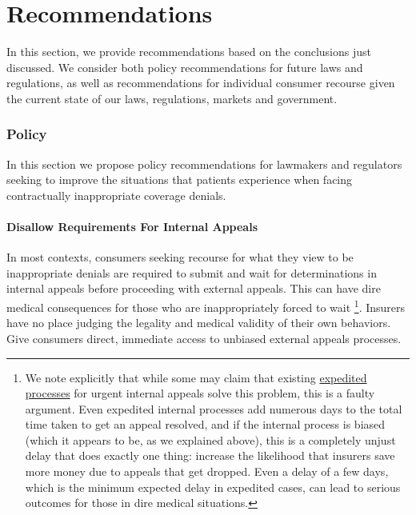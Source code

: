 \documentclass[12pt, a4paper,twoside]{report}
\theoremstyle{plain} %
\theoremstyle{definition} %
\theoremstyle{remark} %
\numberwithin{equation}{chapter}
\begin{document}
		\chapter{Recommendations}\label{recommendations}
		
		In this section, we provide recommendations based on the conclusions just discussed. We consider both policy recommendations for future laws and regulations, as well as recommendations for individual consumer recourse given the current state of our laws, regulations, markets and government.
		
		\subsection{Policy}
		
		In this section we propose policy recommendations for lawmakers and regulators seeking to improve the situations that patients experience when facing contractually inappropriate coverage denials.
		
		\subsubsection{Disallow Requirements For Internal Appeals}
		
		In most contexts, consumers seeking recourse for what they view to be inappropriate denials are required to submit and wait for determinations in internal appeals before proceeding with external appeals. This can have dire medical consequences for those who are inappropriately forced to wait \footnote{We note explicitly that while some may claim that existing \href{https://www.healthcare.gov/marketplace-appeals/expedited-appeal/}{expedited processes} for urgent internal appeals solve this problem, this is a faulty argument. Even expedited internal processes add numerous days to the total time taken to get an appeal resolved, and if the internal process is biased (which it appears to be, as we explained above), this is a completely unjust delay that does exactly one thing: increase the likelihood that insurers save more money due to appeals that get dropped. Even a delay of a few days, which is the minimum expected delay in expedited cases, can lead to serious outcomes for those in dire medical situations.}. Insurers have no place judging the legality and medical validity of their own behaviors. Give consumers direct, immediate access to unbiased external appeals processes.
		
\end{document}
